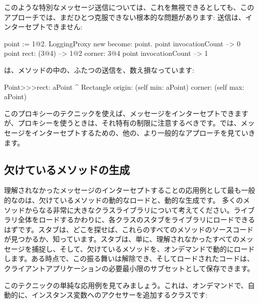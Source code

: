 \documentclass[a4paper,10pt,twoside]{book}
\begin{document}
このような特別なメッセージ送信については、これを無視できるとしても、このアプローチでは、まだひとつ克服できない根本的な問題があります: \self 送信は、インターセプトできません:
\begin{code}{}
point := 1@2.
LoggingProxy new become: point.
point invocationCount --> 0
point rect: (3@4)        --> 1@2 corner: 3@4
point invocationCount --> 1
\end{code}

は、メソッドの中の、ふたつの\self 送信を、数え損なっています: %
\begin{code}{}
Point>>>rect: aPoint 
	^ Rectangle  origin: (self min: aPoint) corner: (self max: aPoint)
\end{code}

このプロキシーのテクニックを使えば、メッセージをインターセプトできますが、プロキシーを使うときは、それ特有の制限に注意するべきです。では、メッセージをインターセプトするための、他の、より一般的なアプローチを見ていきます。

\subsection{欠けているメソッドの生成}

理解されなかったメッセージのインターセプトすることの応用例として最も一般的なのは、欠けているメソッドの動的なロードと、動的な生成です。
多くのメソッドからなる非常に大きなクラスライブラリについて考えてください。ライブラリ全体をロードするかわりに、各クラスのスタブをライブラリにロードできるはずです。スタブは、どこを探せば、これらのすべてのメソッドのソースコードが見つかるか、知っています。スタブは、単に、理解されなかったすべてのメッセージを捕捉し、そして、欠けているメソッドを、オンデマンドで動的にロードします。ある時点で、この振る舞いは解除でき、そしてロードされたコードは、クライアントアプリケーションの必要最小限のサブセットとして保存できます。


このテクニックの単純な応用例を見てみましょう。これは、オンデマンドで、自動的に、インスタンス変数へのアクセサーを追加するクラスです: %
\end{document}

